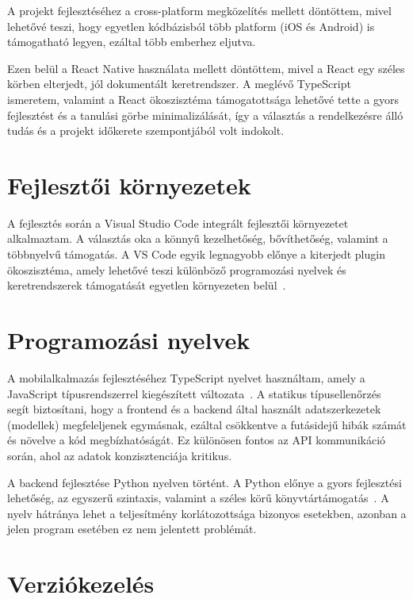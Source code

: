 \documentclass[
]{thesis-ekf}
\theoremstyle{definition}
\theoremstyle{remark}
\begin{document}
A projekt fejlesztéséhez a cross-platform megközelítés mellett döntöttem, mivel lehetővé teszi, hogy egyetlen kódbázisból több platform (iOS és Android) is támogatható legyen, ezáltal több emberhez eljutva.

Ezen belül a React Native használata mellett döntöttem, mivel a React egy széles körben elterjedt, jól dokumentált keretrendszer. A meglévő TypeScript ismeretem, valamint a React ökoszisztéma támogatottsága lehetővé tette a gyors fejlesztést és a tanulási görbe minimalizálását, így a választás a rendelkezésre álló tudás és a projekt időkerete szempontjából volt indokolt.

\section{Fejlesztői környezetek}

A fejlesztés során a Visual Studio Code integrált fejlesztői környezetet alkalmaztam. A választás oka a könnyű kezelhetőség, bővíthetőség, valamint a többnyelvű támogatás. A VS Code egyik legnagyobb előnye a kiterjedt plugin ökoszisztéma, amely lehetővé teszi különböző programozási nyelvek és keretrendszerek támogatását egyetlen környezeten belül~\cite{vs_code}.

\section{Programozási nyelvek}

A mobilalkalmazás fejlesztéséhez TypeScript nyelvet használtam, amely a JavaScript típusrendszerrel kiegészített változata~\cite{typescript}. A statikus típusellenőrzés segít biztosítani, hogy a frontend és a backend által használt adatszerkezetek (modellek) megfeleljenek egymásnak, ezáltal csökkentve a futásidejű hibák számát és növelve a kód megbízhatóságát. Ez különösen fontos az API kommunikáció során, ahol az adatok konzisztenciája kritikus.

A backend fejlesztése Python nyelven történt. A Python előnye a gyors fejlesztési lehetőség, az egyszerű szintaxis, valamint a széles körű könyvtártámogatás~\cite{python}. A nyelv hátránya lehet a teljesítmény korlátozottsága bizonyos esetekben, azonban a jelen program esetében ez nem jelentett problémát.

\section{Verziókezelés}
\end{document}

